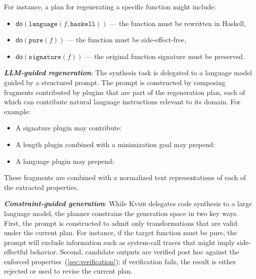 \documentclass[sigplan]{acmart}
\newcommand{\sys}{{\scshape Kv{\textalpha}sir}\xspace}
\newcommand{\heading}[1]{\vspace{2pt}\noindent\textbf{\emph{#1}}:\enspace}
\begin{document}
For instance, a plan for regenerating a specific function might include:
\begin{itemize}
  \item $\mathsf{do}(\texttt{language}(f, \texttt{haskell}))$ — the function must be rewritten in Haskell,
  \item $\mathsf{do}(\texttt{pure}(f))$ — the function must be side-effect-free,
  \item $\mathsf{do}(\texttt{signature}(f))$ — the original function signature must be preserved.
\end{itemize}

\heading{LLM-guided regeneration}
The synthesis task is delegated to a language model guided by a structured prompt. The prompt is constructed by composing fragments contributed by plugins that are part of the regeneration plan, each of which can contribute natural language instructions relevant to its domain. For example:
\begin{itemize}
  \item A signature plugin may contribute: \emph{}
  \item A length plugin combined with a minimization goal may prepend: \emph{}
  \item A language plugin may prepend: \emph{}
\end{itemize}

These fragments are combined with a normalized text representations of each of 
the extracted properties.

\heading{Constraint-guided generation}
While \sys delegates code synthesis to a large language model, the planner constrains the generation space in two key ways.
First, the prompt is constructed to admit only transformations that are valid under the current plan.
For instance, if the target function must be pure, the prompt will exclude information such as system-call traces that might imply side-effectful behavior.
Second, candidate outputs are verified post hoc against the enforced properties~(\cref{sec:verification}); if verification fails, the result is either rejected or used to revise the current plan.
\end{document}
